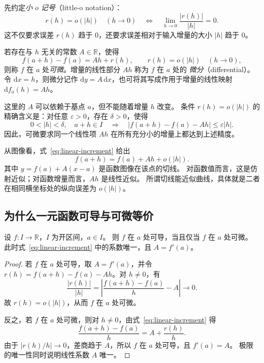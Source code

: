 \documentclass[UTF8,12pt,a4paper,fontset=fandol]{ctexart}
\begin{document}
先约定\emph{小 $o$ 记号}（little-o notation）：
\[
  r(h)=o(|h|)\quad(h\to0)
  \quad\Longleftrightarrow\quad
  \lim_{h\to0}\frac{|r(h)|}{|h|}=0.
\]
这不仅要求误差 $r(h)$ 趋于 $0$，还要求误差相对于输入增量的大小 $|h|$ 趋于 $0$。

\begin{definition}[可微与微分]
\label{def:differentiability}
若存在与 $h$ 无关的常数 $A\in\mathbb R$，使得
\begin{equation}\label{eq:linear-increment}
  f(a+h)-f(a)=Ah+r(h),\qquad r(h)=o(|h|)\quad(h\to0),
\end{equation}
则称 $f$ 在 $a$ 处\emph{可微}。增量的线性部分 $Ah$ 称为 $f$ 在 $a$ 处的
\emph{微分}（differential）。令 $\mathrm dx=h$，则微分记作
$\mathrm dy=A\,\mathrm dx$，也可将其写成作用于增量的线性映射 $\mathrm df_a(h)=Ah$。
\end{definition}

这里的 $A$ 可以依赖于基点 $a$，但不能随着增量 $h$ 改变。
条件 $r(h)=o(|h|)$ 的精确含义是：对任意 $\varepsilon>0$，存在 $\delta>0$，使得
\[
  0<|h|<\delta,\quad a+h\in I
  \quad\Longrightarrow\quad
  |f(a+h)-f(a)-Ah|\le\varepsilon|h|.
\]
因此，可微要求同一个线性项 $Ah$ 在所有充分小的增量上都达到上述精度。

从图像看，式~\eqref{eq:linear-increment} 给出
\[
  f(a+h)=f(a)+Ah+o(|h|).
\]
其中 $y=f(a)+A(x-a)$ 是函数图像在该点的切线。
对函数值而言，这是仿射近似；对函数增量而言，$Ah$ 是线性近似。
所谓切线能近似曲线，具体就是二者在相同横坐标处的纵向误差为 $o(|h|)$。

\subsection{为什么一元函数可导与可微等价}

\begin{theorem}[一元函数可导与可微的等价性]
\label{thm:equivalence}
设 $f:I\to\mathbb R$，$I$ 为开区间，$a\in I$。
则 $f$ 在 $a$ 处可导，当且仅当 $f$ 在 $a$ 处可微。
此时式~\eqref{eq:linear-increment} 中的系数唯一，且 $A=f'(a)$。
\end{theorem}

\begin{proof}
若 $f$ 在 $a$ 处可导，取 $A=f'(a)$，并令
$r(h)=f(a+h)-f(a)-Ah$。对 $h\ne0$，有
\[
  \frac{|r(h)|}{|h|}
  =\left|\frac{f(a+h)-f(a)}{h}-A\right|\longrightarrow0.
\]
故 $r(h)=o(|h|)$，从而 $f$ 在 $a$ 处可微。

反之，若 $f$ 在 $a$ 处可微，则对 $h\ne0$，由式~\eqref{eq:linear-increment} 得
\[
  \frac{f(a+h)-f(a)}{h}=A+\frac{r(h)}{h}.
\]
由于 $|r(h)/h|\to0$，差商趋于 $A$，所以 $f$ 在 $a$ 处可导，且 $f'(a)=A$。
极限的唯一性同时说明线性系数 $A$ 唯一。
\end{proof}
\end{document}
